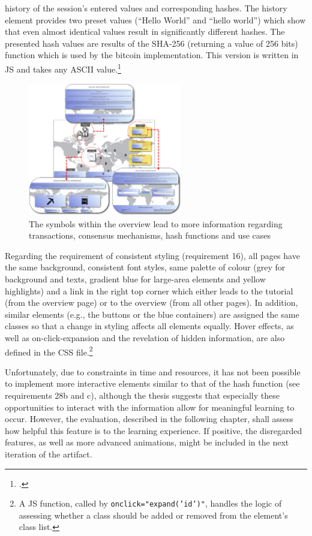 history of the session's entered values and corresponding hashes. The history element provides two preset values (\enquote{Hello World} and \enquote{hello world}) which show that even almost identical values result in significantly different hashes. The presented hash values are results of the \ac{SHA}-256 (returning a value of 256 bits) function which is used by the bitcoin implementation. This version is written in \acl{JS} and takes any ASCII value.\footcite[][]{LuffJavaScriptSHA256demo2014}

\begin{figure}
    \centering
    \includegraphics[width=0.6\textwidth]{latex-vorlage_v1.5/graphics/overview.png}
    \caption[The symbols within the overview lead to more information regarding transactions, consensus mechanisms, hash functions and use cases]{The symbols within the overview lead to more information regarding transactions, consensus mechanisms, hash functions and use cases\protect\footnotemark}
    \label{fig:AniOW}
\end{figure}

Regarding the requirement of consistent styling (requirement 16), all pages have the same background, consistent font styles, same palette of colour (grey for background and texts, gradient blue for large-area elements and yellow highlights) and a link in the right top corner which either leads to the tutorial (from the overview page) or to the overview (from all other pages). In addition, similar elements (e.g., the buttons or the blue containers) are assigned the same classes so that a change in styling affects all elements equally. Hover effects, as well as on-click-expansion and the revelation of hidden information, are also defined in the \ac{CSS} file.\footnote{A \ac{JS} function, called by \texttt{onclick="expand('id')"}, handles the logic of assessing whether a class should be added or removed from the element's class list.} 


Unfortunately, due to constraints in time and resources, it has not been possible to implement more interactive elements similar to that of the hash function (see requirements 28b and c), although the thesis suggests that especially these opportunities to interact with the information allow for meaningful learning to occur. However, the evaluation, described in the following chapter, shall assess how helpful this feature is to the learning experience. If positive, the disregarded features, as well as more advanced animations, might be included in the next iteration of the artifact. 